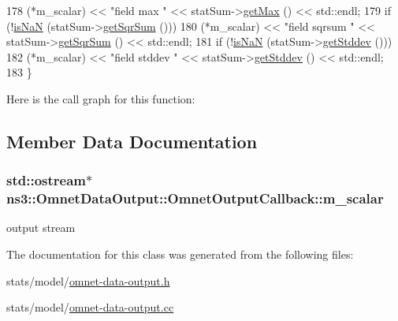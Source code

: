 \begin{DoxyCode}
178     (*m\_scalar) << \textcolor{stringliteral}{"field max "} << statSum->\hyperlink{classns3_1_1StatisticalSummary_a2f6f87e1719bce70ead2c7dead06542a}{getMax} () << std::endl;
179   \textcolor{keywordflow}{if} (!\hyperlink{namespacens3_af0d87e9b87c0909d914f4369e0bfaa0b}{isNaN} (statSum->\hyperlink{classns3_1_1StatisticalSummary_aa596f679778e8f664ca176c570ef13ec}{getSqrSum} ()))
180     (*m\_scalar) << \textcolor{stringliteral}{"field sqrsum "} << statSum->\hyperlink{classns3_1_1StatisticalSummary_aa596f679778e8f664ca176c570ef13ec}{getSqrSum} () << std::endl;
181   \textcolor{keywordflow}{if} (!\hyperlink{namespacens3_af0d87e9b87c0909d914f4369e0bfaa0b}{isNaN} (statSum->\hyperlink{classns3_1_1StatisticalSummary_a5b9acc83876f85a7c35c4943ad43187a}{getStddev} ()))
182     (*m\_scalar) << \textcolor{stringliteral}{"field stddev "} << statSum->\hyperlink{classns3_1_1StatisticalSummary_a5b9acc83876f85a7c35c4943ad43187a}{getStddev} () << std::endl;
183 \}
\end{DoxyCode}


Here is the call graph for this function\+:




\subsection{Member Data Documentation}
\subsubsection[{\texorpdfstring{m\+\_\+scalar}{m_scalar}}]{\setlength{\rightskip}{0pt plus 5cm}std\+::ostream$\ast$ ns3\+::\+Omnet\+Data\+Output\+::\+Omnet\+Output\+Callback\+::m\+\_\+scalar\hspace{0.3cm}{\ttfamily [private]}}\hypertarget{classns3_1_1OmnetDataOutput_1_1OmnetOutputCallback_a9773048f745ee823d0736fd388f4522c}{}\label{classns3_1_1OmnetDataOutput_1_1OmnetOutputCallback_a9773048f745ee823d0736fd388f4522c}


output stream 



The documentation for this class was generated from the following files\+:\begin{DoxyCompactItemize}
\item 
stats/model/\hyperlink{omnet-data-output_8h}{omnet-\/data-\/output.\+h}\item 
stats/model/\hyperlink{omnet-data-output_8cc}{omnet-\/data-\/output.\+cc}\end{DoxyCompactItemize}
